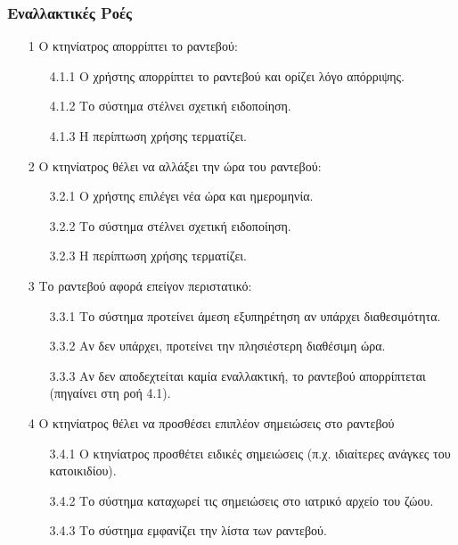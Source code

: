 \documentclass[12pt,a4paper,twoside]{book}
\begin{document}
\subsubsection{Εναλλακτικές Ροές}
\begin{enumerate}
  \item[1 ] Ο κτηνίατρος απορρίπτει το ραντεβού:
        \begin{enumerate}
          \item[4.1.1 ] Ο χρήστης απορρίπτει το ραντεβού και ορίζει λόγο απόρριψης. %
          \item[4.1.2 ] Το σύστημα στέλνει σχετική ειδοποίηση. %
          \item[4.1.3 ] Η περίπτωση χρήσης τερματίζει.
        \end{enumerate}
  \item[2 ] Ο κτηνίατρος θέλει να αλλάξει την ώρα του ραντεβού:
        \begin{enumerate}
          \item[3.2.1 ] Ο χρήστης επιλέγει νέα ώρα και ημερομηνία.
          \item[3.2.2 ] Το σύστημα στέλνει σχετική ειδοποίηση. %
          \item[3.2.3 ] Η περίπτωση χρήσης τερματίζει.
        \end{enumerate}
  \item[3 ] Το ραντεβού αφορά επείγον περιστατικό:
        \begin{enumerate}
          \item[3.3.1 ] Το σύστημα προτείνει άμεση εξυπηρέτηση αν υπάρχει διαθεσιμότητα. %
          \item[3.3.2 ] Αν δεν υπάρχει, προτείνει την πλησιέστερη διαθέσιμη ώρα. %
          \item[3.3.3 ] Αν δεν αποδεχτείται καμία εναλλακτική, το ραντεβού απορρίπτεται (πηγαίνει στη ροή 4.1). %
        \end{enumerate}
  \item[4 ] Ο κτηνίατρος θέλει να προσθέσει επιπλέον σημειώσεις στο ραντεβού
        \begin{enumerate}
          \item[3.4.1 ] Ο κτηνίατρος προσθέτει ειδικές σημειώσεις (π.χ. ιδιαίτερες ανάγκες του κατοικιδίου). %
          \item[3.4.2 ] Το σύστημα καταχωρεί τις σημειώσεις στο ιατρικό αρχείο του ζώου.
          \item[3.4.3 ] Το σύστημα εμφανίζει την λίστα των ραντεβού.
        \end{enumerate}
\end{enumerate}
\end{document}
